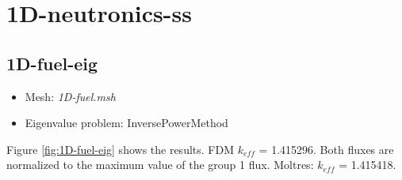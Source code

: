 \documentclass[11pt,letterpaper]{article}
\begin{document}
\section{1D-neutronics-ss}

\subsection{1D-fuel-eig}

	\begin{itemize}
		\item Mesh: \textit{1D-fuel.msh}
		\item Eigenvalue problem: InversePowerMethod
	\end{itemize}

Figure \ref{fig:1D-fuel-eig} shows the results. 
FDM $k_{eff}$ = 1.415296. Both fluxes are normalized to the maximum value of the group 1 flux.
Moltres: $k_{eff}$ = 1.415418.
\end{document}
